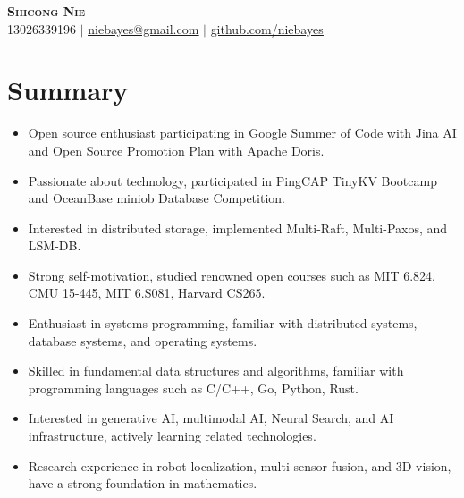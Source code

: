 \documentclass[letterpaper,11pt]{article}
\newcommand{\resumeSubHeadingListStart}{\begin{itemize}[leftmargin=0.15in, label={}]}
\newcommand{\resumeSubHeadingListEnd}{\end{itemize}}
\begin{document}

\begin{center}
    \textbf{\Huge \scshape Shicong Nie} \\ \vspace{1pt}
    \small 13026339196 $|$ \href{mailto:x@x.com}{\underline{niebayes@gmail.com}} $|$ 
    \href{https://github.com/niebayes}{\underline{github.com/niebayes}}
\end{center}

\section{Summary}
  \resumeSubHeadingListStart
    \begin{itemize}
        \item Open source enthusiast participating in Google Summer of Code with Jina AI and Open Source Promotion Plan with Apache Doris.
        \item Passionate about technology, participated in PingCAP TinyKV Bootcamp and OceanBase miniob Database Competition.
        \item Interested in distributed storage, implemented Multi-Raft, Multi-Paxos, and LSM-DB.
        \item Strong self-motivation, studied renowned open courses such as MIT 6.824, CMU 15-445, MIT 6.S081, Harvard CS265.
        \item Enthusiast in systems programming, familiar with distributed systems, database systems, and operating systems.
        \item Skilled in fundamental data structures and algorithms, familiar with programming languages such as C/C++, Go, Python, Rust.
        \item Interested in generative AI, multimodal AI, Neural Search, and AI infrastructure, actively learning related technologies.
        \item Research experience in robot localization, multi-sensor fusion, and 3D vision, have a strong foundation in mathematics.
    \end{itemize}
  \resumeSubHeadingListEnd
\end{document}
